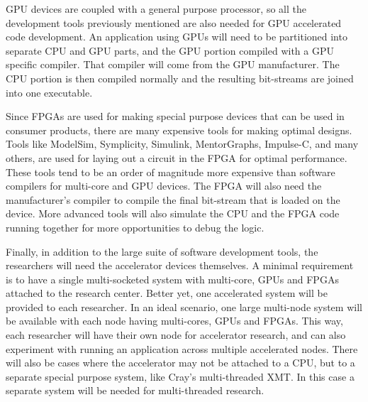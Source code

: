 GPU devices are coupled with a general purpose processor, so all the development tools previously mentioned are also needed for GPU accelerated code development. An application using GPUs will need to be partitioned into separate CPU and GPU parts, and the GPU portion compiled with a GPU specific compiler. That compiler will come from the GPU manufacturer. The CPU portion is then compiled normally and the resulting bit-streams are joined into one executable.

Since FPGAs are used for making special purpose devices that can be used in consumer products, there are many expensive tools for making optimal designs. Tools like ModelSim, Symplicity, Simulink, MentorGraphs, Impulse-C, and many others, are used for laying out a circuit in the FPGA for optimal performance. These tools tend to be an order of magnitude more expensive than software compilers for multi-core and GPU devices. The FPGA will also need the manufacturer’s compiler to compile the final bit-stream that is loaded on the device. More advanced tools will also simulate the CPU and the FPGA code running together for more opportunities to debug the logic.

Finally, in addition to the large suite of software development tools, the researchers will need the accelerator devices themselves. A minimal requirement is to have a single multi-socketed system with multi-core, GPUs and FPGAs attached to the research center. Better yet, one accelerated system will be provided to each researcher. In an ideal scenario, one large multi-node system will be available with each node having multi-cores, GPUs and FPGAs. This way, each researcher will have their own node for accelerator research, and can also experiment with running an application across multiple accelerated nodes. There will also be cases where the accelerator may not be attached to a CPU, but to a separate
special purpose system, like Cray’s multi-threaded XMT. In this case a separate system will be needed for multi-threaded research.


